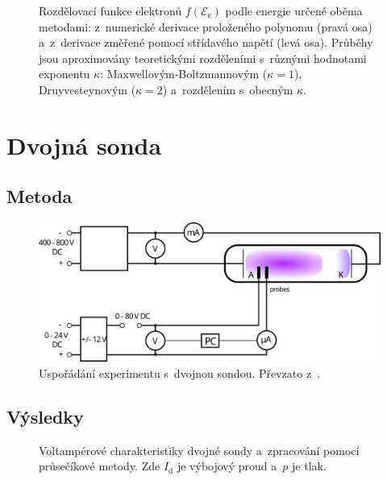 \documentclass{protokol}
\newcommand\pres{p}
\newcommand\idisch{I_\mathrm{d}}
\newcommand\enelec{\mathcal E_\mathrm{e}}
\newcommand\eedf{f(\enelec)}
\begin{document}
\begin{figure}[p]
	\centering
	
	\par\smallskip
	
	\par\smallskip
	
	\caption{Rozdělovací funkce elektronů $\eedf$ podle energie určené
		oběma metodami: z~numerické derivace proloženého polynomu (pravá osa)
		a~z~derivace změřené pomocí střídavého napětí (levá osa).
		Průběhy jsou aproximovány teoretickými rozděleními s~různými hodnotami
		exponentu $\kappa$:
		Max\-wellovým-Boltzmannovým ($\kappa = 1$),
		Druyvesteynovým ($\kappa = 2$)
		a~rozdělením s~obecným $\kappa$.}
	\label{fig:eedf}
\end{figure}

\clearpage
\section{Dvojná sonda}
\label{sec:double}

\subsection{Metoda}
\label{sec:method-double}

\begin{figure}[hbp]
	\centering
	\includegraphics{diagram-double.png}
	\caption{Uspořádání experimentu s~dvojnou sondou.
		Převzato z~\autocite{assignment-doubleprobe}.}
	\label{fig:diagram-double}
\end{figure}

\subsection{Výsledky}
\label{sec:results-double}

\begin{figure}
	\centering
	
	
	\par\smallskip
	
	
	\caption{Voltampérové charakteristiky dvojné sondy
		a~zpracování pomocí průsečíkové metody.
		Zde $\idisch$ je výbojový proud a~$\pres$ je tlak.}
	\label{fig:double-vac}
\end{figure}
\end{document}
